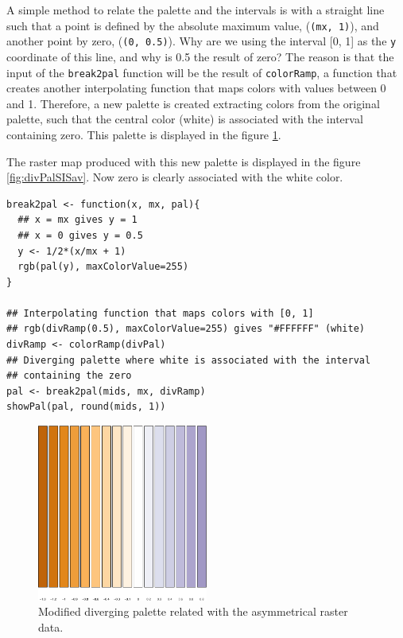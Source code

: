 A simple method to relate the palette and the intervals is with a
straight line such that a point is defined by the absolute maximum
value, (\texttt{(mx, 1)}), and another point by zero, (\texttt{(0, 0.5)}).  Why
are we using the interval [0, 1] as the \texttt{y} coordinate of this
line, and why is 0.5 the result of zero? The reason is that the
input of the \texttt{break2pal} function will be the result of
\texttt{colorRamp}, a function that creates another interpolating
function that maps colors with values between 0 and 1. Therefore,
a new palette is created extracting colors from the original
palette, such that the central color (white) is associated with
the interval containing zero. This palette is displayed in the
figure \ref{fig:showBreak2Pal}.

The raster map produced with this new palette is displayed in the
figure \ref{fig:divPalSISav}. Now zero is clearly associated with the
white color.

\lstset{language=R}
\begin{lstlisting}
break2pal <- function(x, mx, pal){
  ## x = mx gives y = 1
  ## x = 0 gives y = 0.5
  y <- 1/2*(x/mx + 1)
  rgb(pal(y), maxColorValue=255)
}

## Interpolating function that maps colors with [0, 1]
## rgb(divRamp(0.5), maxColorValue=255) gives "#FFFFFF" (white)
divRamp <- colorRamp(divPal)
## Diverging palette where white is associated with the interval
## containing the zero
pal <- break2pal(mids, mx, divRamp)
showPal(pal, round(mids, 1))
\end{lstlisting}

\begin{figure}[h!]
\centering
\includegraphics[width=0.5\textwidth]{figs/showBreak2Pal.pdf}
\caption{\label{fig:showBreak2Pal}Modified diverging palette related with the asymmetrical raster data.}
\end{figure}



